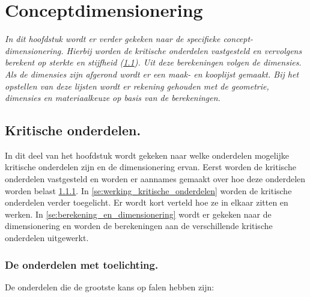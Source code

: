 \chapter{Conceptdimensionering}
\label{Concept_dimensionering}
\textit{In dit hoofdstuk wordt er verder gekeken naar de specifieke concept-dimensionering. Hierbij worden de kritische onderdelen vastgesteld en vervolgens berekent op sterkte en stijfheid (\cref{se:kritische_onderdelen}). Uit deze berekeningen volgen de dimensies. \\
Als de dimensies zijn afgerond wordt er een maak- en kooplijst gemaakt. Bij het opstellen van deze lijsten wordt er rekening gehouden met de geometrie, dimensies en materiaalkeuze op basis van de berekeningen.}


\section{Kritische onderdelen.}
\label{se:kritische_onderdelen}
In dit deel van het hoofdstuk wordt gekeken naar welke onderdelen mogelijke kritische onderdelen zijn en de dimensionering ervan. Eerst worden de kritische onderdelen vastgesteld en worden er aannames gemaakt over hoe deze onderdelen worden belast \cref{se:onderdelen_met_toelichting}. In \cref{se:werking_kritische_onderdelen} worden de kritische onderdelen verder toegelicht. Er wordt kort verteld hoe ze in elkaar zitten en werken. In \cref{se:berekening_en_dimensionering} wordt er gekeken naar de dimensionering en worden de berekeningen aan de verschillende kritische onderdelen uitgewerkt.
\vspace{1mm}

\subsection{De onderdelen met toelichting.}
\label{se:onderdelen_met_toelichting}
De onderdelen die de grootste kans op falen hebben zijn:

